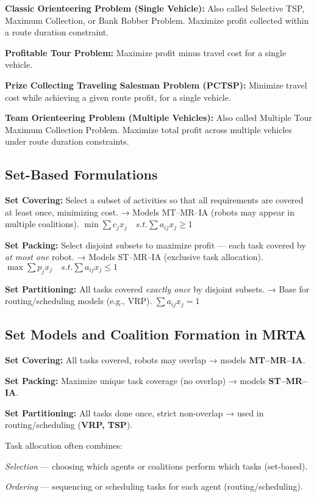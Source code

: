 \begin{tightitemize}
    \item \textbf{Classic Orienteering Problem (Single Vehicle):} Also called Selective TSP, Maximum Collection, or Bank Robber Problem. Maximize profit collected within a route duration constraint.

    \item \textbf{Profitable Tour Problem:} Maximize profit minus travel cost for a single vehicle.

    \item \textbf{Prize Collecting Traveling Salesman Problem (PCTSP):} Minimize travel cost while achieving a given route profit, for a single vehicle.

    \item \textbf{Team Orienteering Problem (Multiple Vehicles):} Also called Multiple Tour Maximum Collection Problem. Maximize total profit across multiple vehicles under route duration constraints.
\end{tightitemize}

\subsection*{Set-Based Formulations}
\begin{tightitemize}
    \item \textbf{Set Covering:} Select a subset of activities so that all requirements are covered at least once, minimizing cost.
    → Models MT–MR–IA (robots may appear in multiple coalitions).
    $
    \min \sum c_j x_j \quad s.t. \sum a_{ij} x_j \ge 1
    $

    \item \textbf{Set Packing:} Select disjoint subsets to maximize profit — each task covered by \textit{at most one} robot.
    → Models ST–MR–IA (exclusive task allocation).
    $
    \max \sum p_j x_j \quad s.t. \sum a_{ij} x_j \le 1
    $

    \item \textbf{Set Partitioning:} All tasks covered \textit{exactly once} by disjoint subsets.
    → Base for routing/scheduling models (e.g., VRP).
    $
    \sum a_{ij} x_j = 1
    $
\end{tightitemize}

\subsection*{Set Models and Coalition Formation in MRTA}
\begin{tightitemize}
    \item \textbf{Set Covering:} All tasks covered, robots may overlap → models \textbf{MT–MR–IA}.
    \item \textbf{Set Packing:} Maximize unique task coverage (no overlap) → models \textbf{ST–MR–IA}.
    \item \textbf{Set Partitioning:} All tasks done once, strict non-overlap → used in routing/scheduling (\textbf{VRP, TSP}).
\end{tightitemize}

Task allocation often combines:
\begin{tightitemize}
    \item \textit{Selection} — choosing which agents or coalitions perform which tasks (set-based).
    \item \textit{Ordering} — sequencing or scheduling tasks for each agent (routing/scheduling).
\end{tightitemize}